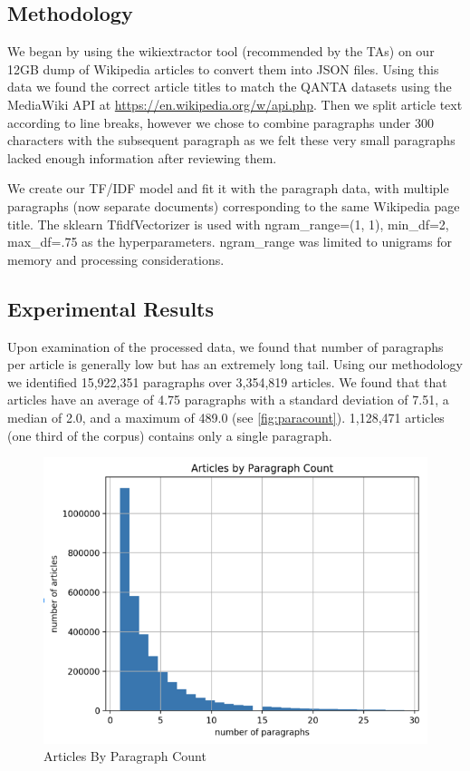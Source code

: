 \documentclass[11pt,a4paper]{article}
\begin{document}
\subsection{Methodology}
We began by using the wikiextractor tool (recommended by the TAs) on our 12GB dump of Wikipedia articles to convert them into JSON files.  Using this data we found the correct article titles to match the \textsc{QANTA} datasets using the MediaWiki API at \url{https://en.wikipedia.org/w/api.php}.  Then we split article text according to line breaks, however we chose to combine paragraphs under 300 characters with the subsequent paragraph as we felt these very small paragraphs lacked enough information after reviewing them.

We create our \textsc{TF/IDF} model and fit it with the paragraph data, with multiple paragraphs (now separate documents) corresponding to the same Wikipedia page title.  The sklearn TfidfVectorizer is used with ngram\_range=(1, 1), min\_df=2, max\_df=.75 as the hyperparameters.  ngram\_range was limited to unigrams for memory and processing considerations.

\subsection{Experimental Results}
Upon examination of the processed data, we found that number of paragraphs per article is generally low but has an extremely long tail.  Using our methodology we identified 15,922,351 paragraphs over 3,354,819 articles.   We found that that articles have an average of 4.75 paragraphs with a standard deviation of 7.51, a median of 2.0, and a maximum of 489.0 (see \autoref{fig:paracount}).  1,128,471 articles (one third of the corpus) contains only a single paragraph.

\begin{figure}[ht]
  \includegraphics[width=\columnwidth]{assets/articles-by-para-count.png}
  \caption{Articles By Paragraph Count}
  \label{fig:paracount}
\end{figure}
\end{document}
